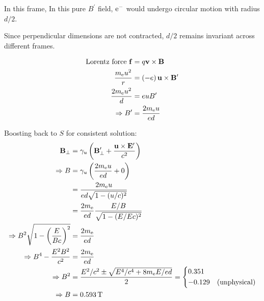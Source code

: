 \begin{parts}
\begin{subparts}
		\newpage
		In this frame,
		In this pure $B^\prime$ field, $\mathrm{e}^{-}$ would undergo circular motion with radius $d/2$.
		
		Since perpendicular dimensions are not contracted, $d/2$ remains invariant across different frames.
		
		\begin{align*}
			\textnormal{Lorentz force } \mathbf{f} &= q\mathbf{v}\times\mathbf{B} \\
			\frac{m_\mathrm{e} u^2}{r} &= \left(-e\right)\mathbf{u}\times\mathbf{B}^\prime \\
			\frac{2m_\mathrm{e} u^2}{d} &= euB^\prime \\
			\Rightarrow B^\prime &= \frac{2m_\mathrm{e} u}{ed}
		\end{align*}
		
		Boosting back to $S$ for consistent solution:
		\begin{align*}
			\mathbf{B}_\perp &= \gamma_u \rbracket{\mathbf{B}_\perp^\prime + \frac{\mathbf{u}\times\mathbf{E}^\prime}{c^2}} \\
			\Rightarrow B &= \gamma_u \rbracket{\frac{2\masselectron u}{ed} + 0} \\
			&= \frac{2\masselectron u}{ed\sqrt{1-(u/c)^2}} \\
			&= \frac{2\masselectron}{ed} \frac{E/B}{\sqrt{1-(E/Ec)^2}} \\
			\Rightarrow B^2 \sqrt{1-\rbracket{\frac{E}{Bc}}^2} &= \frac{2\masselectron}{ed} \\
			\Rightarrow B^4 - \frac{E^2 B^2}{c^2} &= \frac{2\masselectron}{ed} \\
			\Rightarrow B^2 &= \frac{E^2/c^2 \pm \sqrt{E^4/c^4 + 8\masselectron E/ed}}{2}
				= \begin{cases*}
					\num{0.351} \\
					\num{-0.129} \mtext{(unphysical)}
				\end{cases*} \\
			\Rightarrow B &= \SI{0.593}{\tesla}
		\end{align*}
	\end{subparts}
\end{parts}